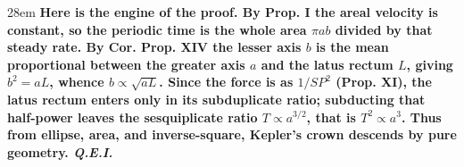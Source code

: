 \documentclass[border=4pt]{standalone}
\begin{document}
\begin{varwidth}{28em}
\large\bfseries
Here is the engine of the proof. By Prop. I the areal velocity is constant, so      the periodic time is the whole area $\pi a b$ divided by that steady rate.      By Cor. Prop. XIV the lesser axis $b$ is the mean proportional between the greater axis      $a$ and the latus rectum $L$, giving $b^2 = aL$, whence $b \propto \sqrt{aL}$.      Since the force is as $1/SP^2$ (Prop. XI), the latus rectum enters only in its subduplicate ratio;      subducting that half-power leaves the sesquiplicate ratio $T \propto a^{3/2}$, that is      $T^2 \propto a^3$. Thus from ellipse, area, and inverse-square, Kepler's crown descends by pure geometry. \textit{Q.E.I.}
\end{varwidth}
\end{document}
